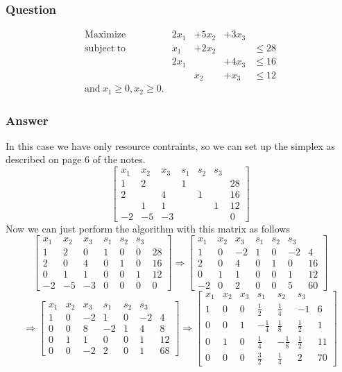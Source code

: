 \documentclass[12pt]{article}
\begin{document}
\subsubsection{Question}
\[\begin{array}{lllll} 
\mathrm{Maximize} & 2x_1& +5x_2 & +3x_3\\
\mathrm{subject\ to}& x_1&+2x_2& &\leq 28\\
&2x_1&&+ 4 x_3& \leq 16\\
&&x_2&+x_3&\leq 12\\
\mathrm{and\ }x_1\geq 0, x_2\geq 0.
 \end{array}\]

\subsubsection{Answer}
In this case we have only resource contraints, so we can set up the simplex as described on page 6 of the notes.
\[\left[\begin{array}{lll|lll|l}
x_1& x_2&x_3&s_1& s_2 & s_3 & \\
\hline 
1 & 2 &&1&&&28\\
2&&4&&1&&16\\
&1&1&&&1&12\\
\hline
-2&-5&-3&&&&0
\end{array}\right]\]
Now we can just perform the algorithm with this matrix as follows
\[
\left[\begin{array}{lll|lll|l}
x_1& x_2&x_3&s_1& s_2 & s_3 & \\
\hline 
1 & 2 &0&1&0&0&28\\
2&0&4&0&1&0&16\\
0&1&1&0&0&1&12\\
\hline
-2&-5&-3&0&0&0&0
\end{array}\right]
\Rightarrow
\left[\begin{array}{lll|lll|l}
x_1& x_2&x_3&s_1& s_2 & s_3 & \\
\hline 
1 & 0 &-2&1&0&-2&4\\
2&0&4&0&1&0&16\\
0&1&1&0&0&1&12\\
\hline
-2&0&2&0&0&5&60
\end{array}\right]
\]
\[
\Rightarrow
\left[\begin{array}{lll|lll|l}
x_1& x_2&x_3&s_1& s_2 & s_3 & \\
\hline 
1 & 0 &-2&1&0&-2&4\\
0&0&8&-2&1&4&8\\
0&1&1&0&0&1&12\\
\hline
0&0&-2&2&0&1&68
\end{array}\right]
\Rightarrow
\left[\begin{array}{lll|lll|l}
x_1& x_2&x_3&s_1& s_2 & s_3 & \\
\hline 
1 & 0 &0&\frac{1}{2}&\frac{1}{4}&-1&6\\
0&0&1&-\frac{1}{4}&\frac{1}{8}&\frac{1}{2}&1\\
0&1&0&\frac{1}{4}&-\frac{1}{8}&\frac{1}{2}&11\\
\hline
0&0&0&\frac{3}{2}&\frac{1}{4}&2&70
\end{array}\right]
\]
\end{document}
